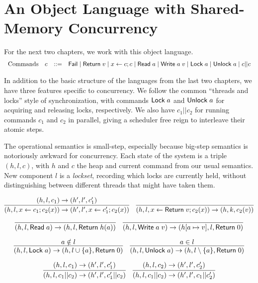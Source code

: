 \documentclass{amsbook}
\theoremstyle{definition}
\theoremstyle{remark}
\numberwithin{section}{chapter}
\numberwithin{equation}{chapter}
\begin{document}
\section{An Object Language with Shared-Memory Concurrency}

For the next two chapters, we work with this object language.
$$\begin{array}{rrcl}
  \textrm{Commands} & c &::=& \mathsf{Fail} \mid \mathsf{Return} \; v \mid x \leftarrow c; c \mid \mathsf{Read} \; a \mid \mathsf{Write} \; a \; v \mid \mathsf{Lock} \; a \mid \mathsf{Unlock} \; a \mid c || c
\end{array}$$

In addition to the basic structure of the languages from the last two chapters, we have three features specific to concurrency.
We follow the common ``threads and locks'' style of synchronization, with commands $\mathsf{Lock} \; a$ and $\mathsf{Unlock} \; a$ for acquiring and releasing locks, respectively.
We also have $c_1 || c_2$ for running commands $c_1$ and $c_2$ in parallel, giving a scheduler free reign to interleave their atomic steps.

The operational semantics is small-step, especially because big-step semantics is notoriously awkward for concurrency.
Each state of the system is a triple $(h, l, c)$, with $h$ and $c$ the heap and current command from our usual semantics.
New component $l$ is a \emph{lockset}, recording which locks are currently held, without distinguishing between different threads that might have taken them.

$$\infer{\smallstep{(h, l, x \leftarrow c_1; c_2(x))}{(h', l', x \leftarrow c'_1; c_2(x))}}{
  \smallstep{(h, l, c_1)}{(h', l', c'_1)}
}
\quad \infer{\smallstep{(h, l, x \leftarrow \mt{Return} \; v; c_2(x))}{(h, k, c_2(v))}}{}$$

$$\infer{\smallstep{(h, l, \mt{Read} \; a)}{(h, l, \mt{Return} \; \msel{h}{a})}}{}
\quad \infer{\smallstep{(h, l, \mt{Write} \; a \; v)}{(\mupd{h}{a}{v}, l, \mt{Return} \; 0)}}{}$$

$$\infer{\smallstep{(h, l, \mt{Lock} \; a)}{(h, l \cup \{a\}, \mt{Return} \; 0)}}{
  a \notin l
}
\quad \infer{\smallstep{(h, l, \mt{Unlock} \; a)}{(h, l \setminus \{a\}, \mt{Return} \; 0)}}{
  a \in l
}$$

$$\infer{\smallstep{(h, l, c_1 || c_2)}{(h', l', c'_1 || c_2)}}{
  \smallstep{(h, l, c_1)}{(h', l', c'_1)}
}
\quad \infer{\smallstep{(h, l, c_1 || c_2)}{(h', l', c_1 || c'_2)}}{
  \smallstep{(h, l, c_2)}{(h', l', c'_2)}
}$$
\end{document}
